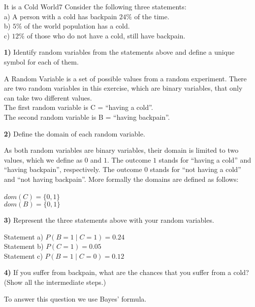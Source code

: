 \begin{questions}

\begin{question}{It is a Cold World}{7}
Consider the following three statements:
\\
a) A person with a cold has backpain $24\%$ of the time.
\\
b) $5\%$ of the world population has a cold.
\\
c) $12\%$ of those who do not have a cold, still have backpain.

\textbf{1)} Identify random variables from the statements above and define a unique symbol for each of them.\\
\begin{answer}
 A Random Variable is a set of possible values from a random experiment. There are two random variables in this exercise, which are binary variables, that only can take two different values. \\
The first random variable is C = ``having a cold''.\\
The second random variable is B = ``having backpain''.
\end{answer}
\textbf{2)} Define the domain of each random variable.\\
\begin{answer}
As both random variables are binary variables, their domain is limited to two values, which we define as $0$ and $1$. The outcome $1$ stands for ``having a cold'' and ``having backpain'', respectively. The outcome $0$ stands for ``not having a cold'' and ``not having backpain''. More formally the domains are defined as follows:\\ \\
$dom(C) = \{0,1\}$\\
$dom(B) = \{0,1\}$
\end{answer}
\textbf{3)} Represent the three statements above with your random variables.\\
\begin{answer}
Statement a) \qquad $P(B=1\mid C=1) = 0.24$\\
Statement b) \qquad $P(C=1) = 0.05$\\
Statement c) \qquad $P(B=1\mid C=0) = 0.12$
\end{answer}
\textbf{4)} If you suffer from backpain, what are the chances that you suffer from a cold? (Show all the intermediate steps.)
\begin{answer}
To answer this question we use Bayes' formula.\\ \\

\end{answer}
\end{question}
\end{questions}
